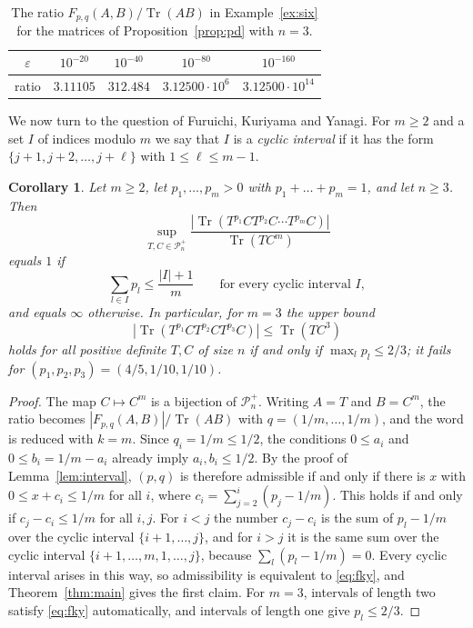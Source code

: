 \documentclass{amsart}
\newtheorem{corollary}[theorem]{Corollary}
\theoremstyle{definition}
\theoremstyle{remark}
\numberwithin{equation}{section}
\newcommand{\Tr}{\operatorname{Tr}}
\newcommand{\PD}{\mathcal{P}_n^{+}}
\begin{document}
\begin{table}[ht]
\caption{The ratio $F_{p,q}(A,B)/\Tr(AB)$ in Example~\ref{ex:six} for the matrices of Proposition~\ref{prop:pd} with $n=3$.}\label{tab:six}
\begin{tabular}{ccccc}
\toprule
$\varepsilon$ & $10^{-20}$ & $10^{-40}$ & $10^{-80}$ & $10^{-160}$\\
\midrule
ratio & $3.11105$ & $312.484$ & $3.12500\cdot 10^{6}$ & $3.12500\cdot 10^{14}$\\
\bottomrule
\end{tabular}
\end{table}

We now turn to the question of Furuichi, Kuriyama and Yanagi. For $m\ge 2$ and a set $I$ of indices modulo $m$ we say that $I$ is a \emph{cyclic interval} if it has the form $\{j+1,j+2,\dots,j+\ell\}$ with $1\le\ell\le m-1$.

\begin{corollary}\label{cor:fky}
Let $m\ge 2$, let $p_1,\dots,p_m>0$ with $p_1+\dots+p_m=1$, and let $n\ge 3$. Then
\[
\sup_{T,C\in\PD}\frac{|\Tr(T^{p_1}CT^{p_2}C\cdots T^{p_m}C)|}{\Tr(TC^m)}
\]
equals $1$ if
\begin{equation}\label{eq:fky}
\sum_{l\in I}p_l\le\frac{|I|+1}{m}\qquad\text{for every cyclic interval } I,
\end{equation}
and equals $\infty$ otherwise. In particular, for $m=3$ the upper bound
\[
|\Tr(T^{p_1}CT^{p_2}CT^{p_3}C)|\le\Tr(TC^3)
\]
holds for all positive definite $T,C$ of size $n$ if and only if $\max_lp_l\le 2/3$; it fails for $(p_1,p_2,p_3)=(4/5,1/10,1/10)$.
\end{corollary}

\begin{proof}
The map $C\mapsto C^m$ is a bijection of $\PD$. Writing $A=T$ and $B=C^m$, the ratio becomes $|F_{p,q}(A,B)|/\Tr(AB)$ with $q=(1/m,\dots,1/m)$, and the word is reduced with $k=m$. Since $q_i=1/m\le 1/2$, the conditions $0\le a_i$ and $0\le b_i=1/m-a_i$ already imply $a_i,b_i\le 1/2$. By the proof of Lemma~\ref{lem:interval}, $(p,q)$ is therefore admissible if and only if there is $x$ with $0\le x+c_i\le 1/m$ for all $i$, where $c_i=\sum_{j=2}^{i}(p_j-1/m)$. This holds if and only if $c_j-c_i\le 1/m$ for all $i,j$. For $i<j$ the number $c_j-c_i$ is the sum of $p_l-1/m$ over the cyclic interval $\{i+1,\dots,j\}$, and for $i>j$ it is the same sum over the cyclic interval $\{i+1,\dots,m,1,\dots,j\}$, because $\sum_l(p_l-1/m)=0$. Every cyclic interval arises in this way, so admissibility is equivalent to \eqref{eq:fky}, and Theorem~\ref{thm:main} gives the first claim. For $m=3$, intervals of length two satisfy \eqref{eq:fky} automatically, and intervals of length one give $p_l\le 2/3$.
\end{proof}
\end{document}
